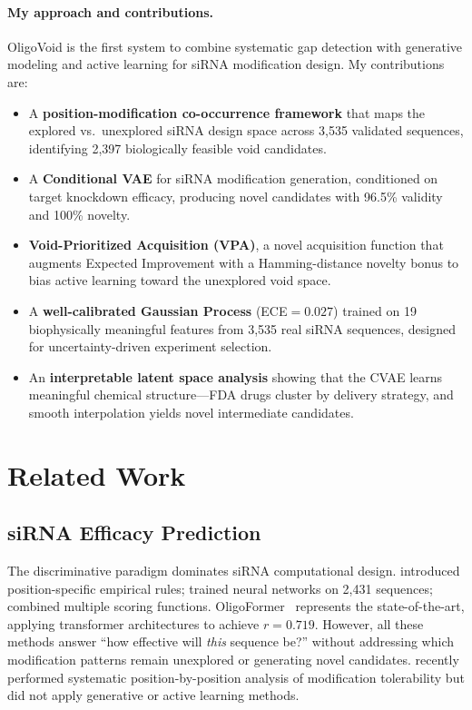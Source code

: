 \documentclass{article}
\begin{document}
\paragraph{My approach and contributions.}
OligoVoid is the first system to combine systematic gap detection with generative modeling and active learning for siRNA modification design. My contributions are:

\begin{itemize}
  \item A \textbf{position-modification co-occurrence framework} that maps the explored vs.\ unexplored siRNA design space across 3,535 validated sequences, identifying 2,397 biologically feasible void candidates.
  \item A \textbf{Conditional VAE} for siRNA modification generation, conditioned on target knockdown efficacy, producing novel candidates with 96.5\% validity and 100\% novelty.
  \item \textbf{Void-Prioritized Acquisition (VPA)}, a novel acquisition function that augments Expected Improvement with a Hamming-distance novelty bonus to bias active learning toward the unexplored void space.
  \item A \textbf{well-calibrated Gaussian Process} (ECE$=0.027$) trained on 19 biophysically meaningful features from 3,535 real siRNA sequences, designed for uncertainty-driven experiment selection.
  \item An \textbf{interpretable latent space analysis} showing that the CVAE learns meaningful chemical structure---FDA drugs cluster by delivery strategy, and smooth interpolation yields novel intermediate candidates.
\end{itemize}


\section{Related Work}

\subsection{siRNA Efficacy Prediction}

The discriminative paradigm dominates siRNA computational design. \citet{reynolds2004} introduced position-specific empirical rules; \citet{huesken2005} trained neural networks on 2,431 sequences; \citet{dsir2004} combined multiple scoring functions. OligoFormer~\citep{oligoformer2024} represents the state-of-the-art, applying transformer architectures to achieve $r=0.719$. However, all these methods answer ``how effective will \emph{this} sequence be?'' without addressing which modification patterns remain unexplored or generating novel candidates. \citet{davis2025} recently performed systematic position-by-position analysis of modification tolerability but did not apply generative or active learning methods.
\end{document}
